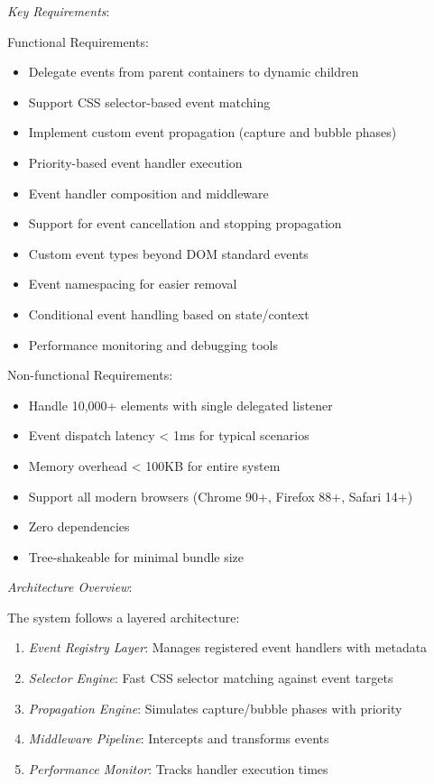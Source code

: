 \documentclass[11pt]{article}
\begin{document}
\emph{Key Requirements}:

Functional Requirements:

\begin{itemize}
\item Delegate events from parent containers to dynamic children
\item Support CSS selector-based event matching
\item Implement custom event propagation (capture and bubble phases)
\item Priority-based event handler execution
\item Event handler composition and middleware
\item Support for event cancellation and stopping propagation
\item Custom event types beyond DOM standard events
\item Event namespacing for easier removal
\item Conditional event handling based on state/context
\item Performance monitoring and debugging tools
\end{itemize}

Non-functional Requirements:

\begin{itemize}
\item Handle 10,000+ elements with single delegated listener
\item Event dispatch latency < 1ms for typical scenarios
\item Memory overhead < 100KB for entire system
\item Support all modern browsers (Chrome 90+, Firefox 88+, Safari 14+)
\item Zero dependencies
\item Tree-shakeable for minimal bundle size
\end{itemize}

\emph{Architecture Overview}:

The system follows a layered architecture:

\begin{enumerate}
\item \emph{Event Registry Layer}: Manages registered event handlers with metadata
\item \emph{Selector Engine}: Fast CSS selector matching against event targets
\item \emph{Propagation Engine}: Simulates capture/bubble phases with priority
\item \emph{Middleware Pipeline}: Intercepts and transforms events
\item \emph{Performance Monitor}: Tracks handler execution times
\end{enumerate}
\end{document}

